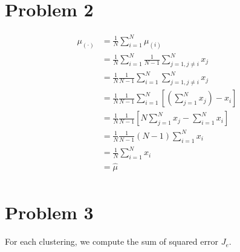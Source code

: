 \documentclass[a4paper, 10pt, twoside]{article}
\begin{document}
\section*{Problem 2}

\newcommand{\fracN}{\frac{1}{N}}
\newcommand{\fracM}{\frac{1}{N-1}}
\newcommand{\sumNi}{\sum_{i=1}^N}
\newcommand{\sumNj}{\sum_{j=1}^N}
\newcommand{\sumM}{\sum_{j=1, j \ne i}^N}

\begin{align*}
	\mu_{(\cdot)}
	 & = \fracN \sumNi \mu_{(i)}                                             \\
	 & = \fracN \sumNi \fracM \sumM x_j                                      \\
	 & = \fracN \fracM \sumNi \sumM x_j                                      \\
	 & = \fracN \fracM \sumNi \left[ \left( \sumNj x_j \right) - x_i \right] \\
	 & = \fracN \fracM \left[ N \sumNj x_j - \sumNi x_i \right]              \\
	 & = \fracN \fracM (N-1) \sumNi x_i                                      \\
	 & = \fracN \sumNi x_i                                                   \\
	 & = \hat{\mu}                                                           \\
\end{align*}

\section*{Problem 3}

\newcommand{\normsq}[1]{\Vert #1 \Vert^2}

For each clustering, we compute the sum of squared error $J_e$.
\end{document}
